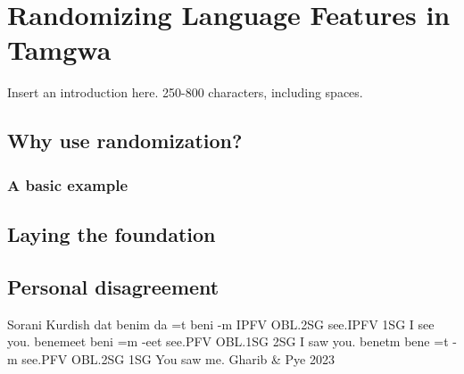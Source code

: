 \documentclass[a4paper,12pt,twoside,openright]{memoir}
\begin{document}


\chapter[Randomizing Language Features][Tamgwa]{Randomizing Language Features in Tamgwa}


\thispagestyle{fancy}
\BgUsetrue


Insert an introduction here. 250-800 characters, including spaces.

\section*{Why use randomization?} %

\lipsum[1]

\subsection*{A basic example}

\lipsum[2]

\section*{Laying the foundation} %

\lipsum[4]

\section*{Personal disagreement} %

\lipsum[4]

\begin{examples}
    \ex
    \lect Sorani Kurdish
    \words {} dat  benim
    \bits da =t beni -m
    \gloss IPFV OBL.2SG see.IPFV 1SG
    \tr I see you.
    \ex
    \words {} benemeet
    \bits beni =m -eet
    \gloss see.PFV OBL.1SG 2SG
    \tr I saw you.
    \ex
    \words {} benetm
    \bits bene =t -m
    \gloss see.PFV OBL.2SG 1SG
    \tr You saw me.
    \source Gharib \& Pye 2023
\end{examples}
\end{document}
